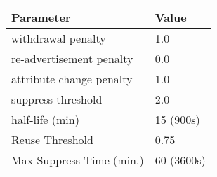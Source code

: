 \begin{center}
	\begin{tabular}{ || m{5cm}| m{2cm} || } 
	\hline
	Parameter & Value \\ 
	\hline \hline
	withdrawal penalty & 1.0 \\
	\hline
    re-advertisement penalty & 0.0 \\
	\hline
    attribute change penalty & 1.0 \\
	\hline
    suppress threshold & 2.0 \\
	\hline
    half-life (min) & 15 (900s) \\
	\hline
    Reuse Threshold & 0.75 \\
	\hline
    Max Suppress Time (min.) & 60 (3600s) \\
	\hline
	\end{tabular}
\end{center}
